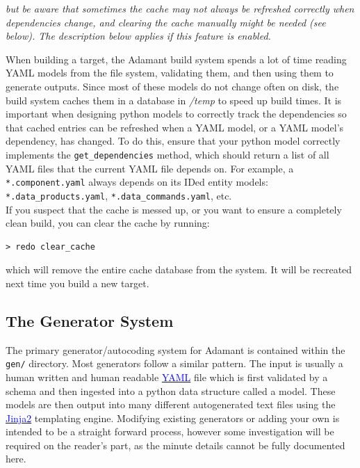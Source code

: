 \textit{but be aware that sometimes the cache may not always be refreshed correctly when dependencies change, and clearing the cache manually might be needed (see below). The description below applies if this feature is enabled.}
\vspace{5mm} %

When building a target, the Adamant build system spends a lot of time reading YAML models from the file system, validating them, and then using them to generate outputs. Since most of these models do not change often on disk, the build system caches them in a database in \textit{/temp} to speed up build times. It is important when designing python models to correctly track the dependencies so that cached entries can be refreshed when a YAML model, or a YAML model's dependency, has changed. To do this, ensure that your python model correctly implements the \texttt{get\_dependencies} method, which should return a list of all YAML files that the current YAML file depends on. For example, a \texttt{*.component.yaml} always depends on its IDed entity models: \texttt{*.data\_products.yaml}, \texttt{*.data\_commands.yaml}, etc. \\

If you suspect that the cache is messed up, or you want to ensure a completely clean build, you can clear the cache by running:

\vspace{5mm} %
\begin{verbatim}
> redo clear_cache
\end{verbatim}
\vspace{5mm} %

which will remove the entire cache database from the system. It will be recreated next time you build a new target.

\subsection{The Generator System} \label{Adding Generators}

The primary generator/autocoding system for Adamant is contained within the \texttt{gen/} directory. Most generators follow a similar pattern. The input is usually a human written and human readable \href{http://yaml.org}{\textcolor{blue}{YAML}} file which is first validated by a schema and then ingested into a python data structure called a model. These models are then output into many different autogenerated text files using the \href{http://jinja.pocoo.org}{\textcolor{blue}{Jinja2}} templating engine. Modifying existing generators or adding your own is intended to be a straight forward process, however some investigation will be required on the reader's part, as the minute details cannot be fully documented here.

